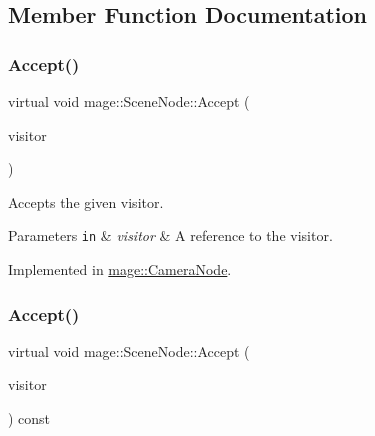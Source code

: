 \subsection{Member Function Documentation}
\hypertarget{classmage_1_1_scene_node_a32ed8763c8f8b4caa155f64551d96f13}{}\label{classmage_1_1_scene_node_a32ed8763c8f8b4caa155f64551d96f13} 
\subsubsection{\texorpdfstring{Accept()}{Accept()}\hspace{0.1cm}{\footnotesize\ttfamily [1/2]}}
{\footnotesize\ttfamily virtual void mage\+::\+Scene\+Node\+::\+Accept (\begin{DoxyParamCaption}\item[{\hyperlink{classmage_1_1_scene_node_visitor}{Scene\+Node\+Visitor} \&}]{visitor }\end{DoxyParamCaption})\hspace{0.3cm}{\ttfamily [pure virtual]}}

Accepts the given visitor.


\begin{DoxyParams}[1]{Parameters}
\mbox{\tt in}  & {\em visitor} & A reference to the visitor. \\
\hline
\end{DoxyParams}


Implemented in \hyperlink{classmage_1_1_camera_node_aed9c3c12cc4163fed880c49e43380efe}{mage\+::\+Camera\+Node}.

\hypertarget{classmage_1_1_scene_node_a35fbfd49185fb61cb4e9edf56af35262}{}\label{classmage_1_1_scene_node_a35fbfd49185fb61cb4e9edf56af35262} 
\subsubsection{\texorpdfstring{Accept()}{Accept()}\hspace{0.1cm}{\footnotesize\ttfamily [2/2]}}
{\footnotesize\ttfamily virtual void mage\+::\+Scene\+Node\+::\+Accept (\begin{DoxyParamCaption}\item[{\hyperlink{classmage_1_1_scene_node_visitor}{Scene\+Node\+Visitor} \&}]{visitor }\end{DoxyParamCaption}) const\hspace{0.3cm}{\ttfamily [pure virtual]}}


